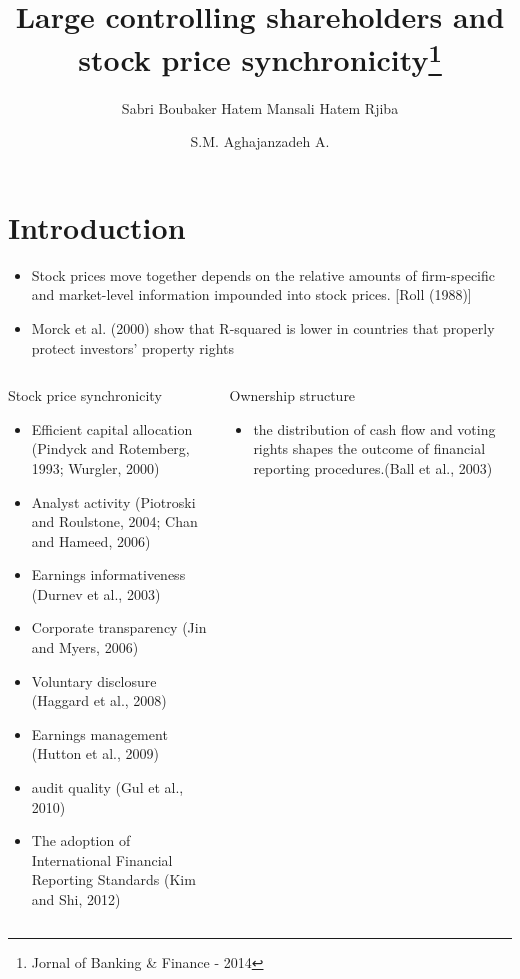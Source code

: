 \documentclass{beamer}
\title[Price Synchronicity]{\large Large controlling shareholders and stock price synchronicity\footnote{ \tiny Jornal of Banking \& Finance - 2014}}
\subtitle{\scriptsize Sabri Boubaker \qquad Hatem Mansali \qquad Hatem Rjiba }
\author[Aghajanzadeh]{S.M. Aghajanzadeh A. }
\institute[]{Tehran Institute for Advanced Studies }
\begin{document}
{\maketitle}
\small

\section{Introduction}
\begin{frame}
	\begin{itemize}
		\scriptsize
		\item Stock prices move together depends on the relative amounts
		of firm-specific and market-level information impounded into
		stock prices.  [Roll (1988)]
		\item Morck et al. (2000) show that R-squared
		is lower in countries that properly protect investors’ property
		rights
	\end{itemize}
\begin{columns}
	\begin{block}{\footnotesize Stock price synchronicity}
			\begin{itemize}
			\tiny
			\item Efficient capital allocation (Pindyck and Rotemberg, 1993; Wurgler, 2000)
			\item  Analyst
			activity (Piotroski and Roulstone, 2004; Chan and Hameed, 2006)
			\item Earnings informativeness (Durnev et al., 2003)
			\item Corporate transparency (Jin and Myers, 2006)
			\item Voluntary disclosure (Haggard et al.,
			2008)
			\item  Earnings management (Hutton et al., 2009)
			\item audit quality
			(Gul et al., 2010)
			\item The adoption of International Financial Reporting Standards (Kim and Shi, 2012)
		\end{itemize}
	\end{block}

	
	
		\begin{block}{\footnotesize Ownership structure }
		\begin{itemize}
			\tiny
			\item  the distribution of cash flow and voting
rights shapes the outcome of financial reporting procedures.(Ball et al., 2003) 


\end{itemize}
\end{block}
\end{columns}
\end{frame}
\end{document}
